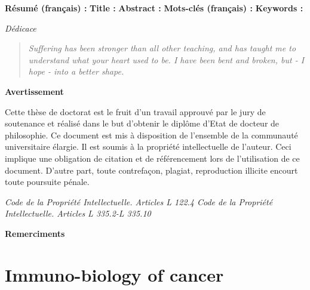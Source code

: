 \documentclass[12pt,]{book}
\theoremstyle{definition}
\theoremstyle{definition}
\theoremstyle{definition}
\theoremstyle{remark}
\begin{document}
\begin{titlepage}
\clearpage


\newpage
\thispagestyle{empty}
\noindent %
\textbf{Résumé (français) :}
\vskip 1cm
\noindent
\textbf{Title :}
\vskip 1cm
\noindent
\textbf{Abstract :}
\vskip 1cm
\noindent
\textbf{Mots-clés (français) :}
\vskip 1cm
\noindent
\textbf{Keywords :}


\newpage
\emph{Dédicace}
\vspace*{\fill}
 \begin{quote}
 \emph{Suffering has been stronger than all other teaching, and has taught me to understand what your heart used to be. I have been bent and broken, but - I hope - into a better shape.}
 \end{quote}
 \vspace*{\fill}

\newpage
\thispagestyle{empty}
\begin{center}
\large{\textbf{Avertissement}}
\end{center}
\vspace{2cm}
Cette thèse de doctorat est le fruit d’un travail approuvé par le jury de soutenance et
réalisé dans le but d’obtenir le diplôme d’Etat de docteur de philosophie. Ce document
est mis à disposition de l’ensemble de la communauté universitaire élargie.
Il est soumis à la propriété intellectuelle de l’auteur. Ceci implique une obligation de
citation et de référencement lors de l’utilisation de ce document.
D’autre part, toute contrefaçon, plagiat, reproduction illicite encourt toute poursuite
pénale.
\vspace*{\fill}

\emph{Code de la Propriété Intellectuelle. Articles L 122.4 \newline
Code de la Propriété Intellectuelle. Articles L 335.2-L 335.10}


\newpage
\thispagestyle{empty}
\begin{center}
\large{\textbf{Remerciments}}
\end{center}
\vspace{2cm}


\end{titlepage}

{
\setcounter{tocdepth}{4}
\tableofcontents
}
\listoftables
\listoffigures
\hypertarget{intro}{%
\chapter{Immuno-biology of cancer}\label{intro}}
\end{document}
